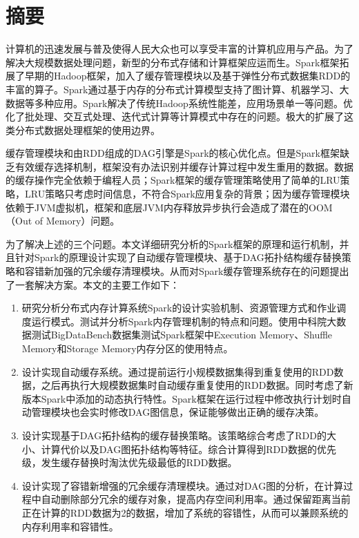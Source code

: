 \maketitle%
\MAKETITLE%
\makedeclaration%
\intobmk\chapter*{摘\quad 要}%
\setcounter{page}{1}%

计算机的迅速发展与普及使得人民大众也可以享受丰富的计算机应用与产品。为了解决大规模数据处理问题，新型的分布式存储和计算框架应运而生。Spark框架拓展了早期的Hadoop框架，加入了缓存管理模块以及基于弹性分布式数据集RDD的丰富的算子。Spark通过基于内存的分布式计算模型支持了图计算、机器学习、大数据等多种应用。Spark解决了传统Hadoop系统性能差，应用场景单一等问题。优化了批处理、交互式处理、迭代式计算等计算模式中存在的问题。极大的扩展了这类分布式数据处理框架的使用边界。

缓存管理模块和由RDD组成的DAG引擎是Spark的核心优化点。但是Spark框架缺乏有效缓存选择机制，框架没有办法识别并缓存计算过程中发生重用的数据。数据的缓存操作完全依赖于编程人员；Spark框架的缓存管理策略使用了简单的LRU策略，LRU策略只考虑时间信息，不符合Spark应用复杂的背景；因为缓存管理模块依赖于JVM虚拟机，框架和底层JVM内存释放异步执行会造成了潜在的OOM（Out of Memory）问题。

为了解决上述的三个问题。本文详细研究分析的Spark框架的原理和运行机制，并且针对Spark的原理设计实现了自动缓存管理模块、基于DAG拓扑结构缓存替换策略和容错新加强的冗余缓存清理模块。从而对Spark缓存管理系统存在的问题提出了一套解决方案。本文的主要工作如下：

\begin{enumerate}
    \item 研究分析分布式内存计算系统Spark的设计实验机制、资源管理方式和作业调度运行模式。测试并分析Spark内存管理机制的特点和问题。使用中科院大数据测试BigDataBench数据集测试Spark框架中Execution Memory、Shuffle Memory和Storage Memory内存分区的使用特点。
    \item 设计实现自动缓存系统。通过提前运行小规模数据集得到重复使用的RDD数据，之后再执行大规模数据集时自动缓存重复使用的RDD数据。同时考虑了新版本Spark中添加的动态执行特性。Spark框架在运行过程中修改执行计划时自动管理模块也会实时修改DAG图信息，保证能够做出正确的缓存决策。
    \item 设计实现基于DAG拓扑结构的缓存替换策略。该策略综合考虑了RDD的大小、计算代价以及DAG图拓扑结构等特征。综合计算得到RDD数据的优先级，发生缓存替换时淘汰优先级最低的RDD数据。
    \item 设计实现了容错新增强的冗余缓存清理模块。通过对DAG图的分析，在计算过程中自动删除部分冗余的缓存对象，提高内存空间利用率。通过保留距离当前正在计算的RDD数据为2的数据，增加了系统的容错性，从而可以兼顾系统的内存利用率和容错性。
\end{enumerate}

